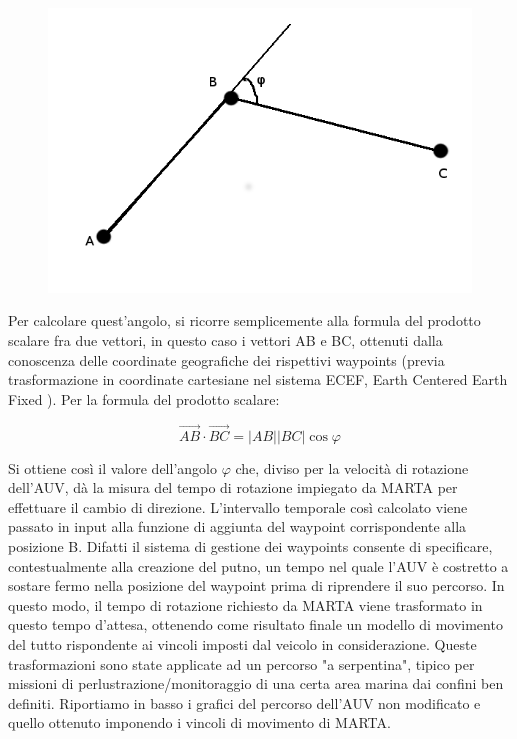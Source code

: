 \documentclass[Lau,binding=0.6cm]{sapthesis}
\begin{document}
\begin{figure}[H]
    \centering
	\includegraphics[scale=0.5]{scalarprod.png}
\end{figure}

Per calcolare quest'angolo, si ricorre semplicemente alla formula del prodotto scalare fra due vettori, in questo caso i vettori AB e BC, ottenuti dalla conoscenza delle coordinate geografiche dei rispettivi waypoints (previa trasformazione in coordinate cartesiane nel sistema ECEF, Earth Centered Earth Fixed ). Per la formula del prodotto scalare:


\begin{equation}
\overrightarrow{AB} \cdot \overrightarrow{BC} = |AB| |BC| \cos{\varphi}    
\end{equation}

 
Si ottiene così il valore dell'angolo $\varphi$ che, diviso per la velocità di rotazione dell'AUV, dà la misura del tempo di rotazione impiegato da MARTA per effettuare il cambio di direzione. \newline L'intervallo temporale così calcolato viene passato in input alla funzione di aggiunta del waypoint corrispondente alla posizione B.
 Difatti il sistema di gestione dei waypoints consente di specificare, contestualmente alla creazione del putno, un tempo nel quale l'AUV è costretto a sostare fermo nella posizione del waypoint prima di riprendere il suo percorso. In questo modo, il tempo di rotazione richiesto da MARTA viene trasformato in questo tempo d'attesa, ottenendo come risultato finale un modello di movimento del tutto rispondente ai vincoli imposti dal veicolo in considerazione.\newline
Queste trasformazioni sono state applicate ad un percorso "a serpentina", tipico per missioni di perlustrazione/monitoraggio di una certa area marina dai confini ben definiti. Riportiamo in basso i grafici del percorso dell'AUV non modificato e quello ottenuto imponendo i vincoli di movimento di MARTA.
\end{document}
